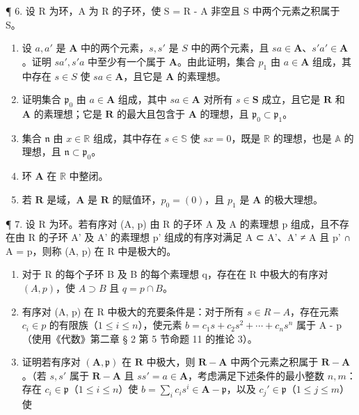 ¶ 6. 设 R 为环，A 为 R 的子环，使 S = R - A 非空且 S 中两个元素之积属于 S。

\begin{enumerate}
\def\labelenumi{(\alph{enumi})}
\item
  设 \(a, a'\) 是 \(\mathbf{A}\) 中的两个元素，\(s, s'\) 是 \(S\) 中的两个元素，且 \(sa \in \mathbf{A}\)、\(s'a' \in \mathbf{A}\)。证明 \(sa', s'a\) 中至少有一个属于 \(\mathbf{A}\)。由此证明，集合 \(p_1\) 由 \(a \in \mathbf{A}\) 组成，其中存在 \(s \in S\) 使 \(sa \in \mathbf{A}\)，且它是 \(\mathbf{A}\) 的素理想。
\item
  证明集合 \(\mathfrak{p}_0\) 由 \(a \in \mathbf{A}\) 组成，其中 \(sa \in \mathbf{A}\) 对所有 \(s \in \mathbf{S}\) 成立，且它是 \(\mathbf{R}\) 和 \(\mathbf{A}\) 的素理想；它是 \(\mathbf{R}\) 的最大且包含于 \(\mathbf{A}\) 的理想，且 \(\mathfrak{p}_0 \subset \mathfrak{p}_1\)。
\item
  集合 \(\mathfrak{n}\) 由 \(x \in \mathbb{R}\) 组成，其中存在 \(s \in \mathbb{S}\) 使 \(sx = 0\)，既是 \(\mathbb{R}\) 的理想，也是 \(\mathbb{A}\) 的理想，且 \(\mathfrak{n} \subset \mathfrak{p}_0\)。
\item
  环 \(\mathbf{A}\) 在 \(\mathbb{R}\) 中整闭。
\item
  若 \(\mathbf{R}\) 是域，\(\mathbf{A}\) 是 \(\mathbf{R}\) 的赋值环，\(p_0 = (0)\)，且 \(p_1\) 是 \(\mathbf{A}\) 的极大理想。
\end{enumerate}

¶ 7. 设 R 为环。若有序对 (A, p) 由 R 的子环 A 及 A 的素理想 p 组成，且不存在由 R 的子环 A' 及 A' 的素理想 p' 组成的有序对满足 A ⊂ A'、A' ≠ A 且 p' ∩ A = p，则称 (A, p) 在 R 中是极大的。

\begin{enumerate}
\def\labelenumi{(\alph{enumi})}
\item
  对于 R 的每个子环 B 及 B 的每个素理想 q，存在在 R 中极大的有序对 \((A, p)\)，使 \(A \supset B\) 且 \(q = p \cap B\)。
\item
  有序对 (A, p) 在 R 中极大的充要条件是：对于所有 \(s \in R - A\)，存在元素 \(c_{i} \in p\) 的有限族（\(1 \leqslant i \leqslant n\)），使元素 \(b = c_{1}s + c_{2}s^{2} + \cdots + c_{n}s^{n}\) 属于 A - p（使用《代数》第二章 § 2 第 5 节命题 11 的推论 3）。
\item
  证明若有序对 \((\mathbf{A},\mathfrak{p})\) 在 \(\mathbf{R}\) 中极大，则 \(\mathbf{R} - \mathbf{A}\) 中两个元素之积属于 \(\mathbf{R} - \mathbf{A}\)。（若 \(s,s'\) 属于 \(\mathbf{R} - \mathbf{A}\) 且 \(ss' = a\in \mathbf{A}\)，考虑满足下述条件的最小整数 \(n,m\)：存在 \(c_{i}\in \mathfrak{p}\)（\(1\leqslant i\leqslant n\)）使 \(b = \sum_{i}c_{i}s^{i}\in \mathbf{A} - \mathfrak{p}\)，以及 \(c_{j}'\in \mathfrak{p}\)（\(1\leqslant j\leqslant m\)）使
\end{enumerate}

